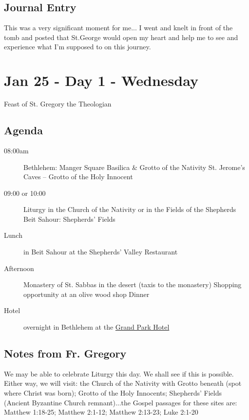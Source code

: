 \documentclass[letterpaper]{report}
\begin{document}
\subsection{Journal Entry}
This was a very significant moment for me... I went and knelt in front of the tomb and posted that St.George would open my heart and help me to see and experience what I'm supposed to on this journey.

\clearpage
\section{Jan 25 - Day 1 - Wednesday}
Feast of St. Gregory the Theologian

\subsection{Agenda}
\begin{description}
	\item[08:00am] Bethlehem: Manger Square
	    \subitem Basilica \& Grotto of the Nativity
	    \subitem St. Jerome's Caves – Grotto of the Holy Innocent
	\item[09:00 or 10:00] Liturgy in the Church of the Nativity or in the 
		Fields of the Shepherds
		\subitem Beit Sahour: Shepherds’ Fields
	\item[Lunch] in Beit Sahour at the Shepherds’ Valley Restaurant 
	\item[Afternoon] Monastery of St. Sabbas in the desert 
	    (taxis to the monastery)
	    \subitem Shopping opportunity at an olive wood shop Dinner 
	    
	\item[Hotel] overnight in Bethlehem at the
	  \href{http://www.grandpark.com/bethlehem/}{Grand Park Hotel}
\end{description}

\subsection{Notes from Fr. Gregory}
We may be able to celebrate Liturgy this day. We shall see if this is possible. Either way, we will visit: the Church of the Nativity with Grotto beneath (spot where Christ was born); Grotto of the Holy Innocents; Shepherds' Fields (Ancient Byzantine Church remnant)...the Gospel passages for these sites are: 
Matthew 1:18-25; Matthew 2:1-12; Matthew 2:13-23; Luke 2:1-20
\end{document}
